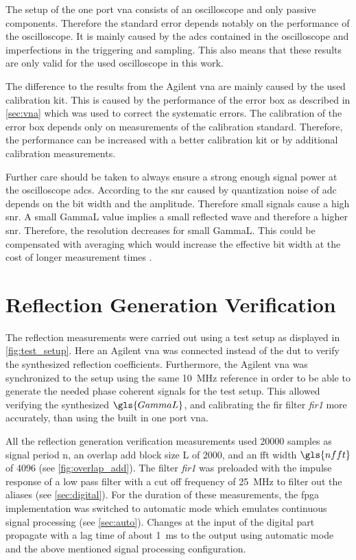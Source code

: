 \documentclass[12pt,a4paper,parskip=full,abstract=true,BCOR=12mm,twoside,open=right]{scrreprt}
\def\device#1{\mbox{\textit{#1}}}
\begin{document}
The setup of the one port \gls{vna} consists of an oscilloscope and only passive components.
Therefore the standard error depends notably on the performance of the oscilloscope. It is
mainly caused by the \glspl{adc} contained in the oscilloscope and imperfections in the
triggering and sampling. This also means that these results are only valid for the
used oscilloscope in this work.

The difference to the results from the Agilent \gls{vna} are mainly caused by the
used calibration kit. This is caused by the performance of the error box as described in
\cref{sec:vna} which was used to correct the systematic errors. The calibration of the error
box depends only on measurements of the calibration standard. Therefore, the performance can
be increased with a better calibration kit or by additional calibration measurements.

Further care should be taken to always ensure a strong enough signal power at the
oscilloscope \glspl{adc}. According to \cite{Oppenheim} the \gls{snr} caused by quantization
noise of \gls{adc} depends on the bit width and the amplitude. Therefore small signals cause
a high \gls{snr}. A small \gls{GammaL} value implies a small reflected wave and therefore a
higher \gls{snr}. Therefore, the resolution decreases for small \gls{GammaL}. This could
be compensated with averaging which would increase the effective bit width at the cost
of longer measurement times \cite{ad_mt004}.


\section{Reflection Generation Verification}
\label{sec:reflection}

The reflection measurements were carried out using a test setup as displayed in \cref{fig:test_setup}.
Here an Agilent \gls{vna} was connected instead of the \gls{dut} to verify the synthesized reflection
coefficients. Furthermore, the Agilent \gls{vna} was synchronized to the setup using the same
\SI{10}{\mega\hertz} reference in order to be able to generate the needed phase coherent
signals for the test setup. This allowed verifying the synthesized $\gls{GammaL}$, and
calibrating the \gls{fir} filter \device{fir1} more accurately, than using the built
in one port \gls{vna}.

All the reflection generation verification measurements used 20000 samples as signal period \gls{n},
an overlap add block size \gls{L} of 2000, and an \gls{fft} width $\gls{nfft}$ of 4096 (see
\cref{fig:overlap_add}). The filter \device{fir1} was preloaded with the
impulse response of a low pass filter with a cut off frequency of \SI{25}{\mega\hertz} to
filter out the aliases (see \cref{sec:digital}). For the duration of these measurements,
the \gls{fpga} implementation was switched to automatic mode which emulates continuous
signal processing (see \cref{sec:auto}). Changes at the input of the digital part propagate
with a lag time of about \SI{1}{\milli\second} to the output using automatic mode and the
above mentioned signal processing configuration.
\end{document}
